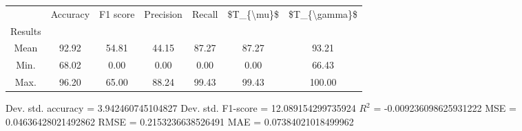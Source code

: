 \begin{tabular}{|c|c|c|c|c|c|c|}
\toprule
{} &  Accuracy &  F1 score &  Precision &  Recall &  \$T\_\{\textbackslash mu\}\$ &  \$T\_\{\textbackslash gamma\}\$ \\
Results &           &           &            &         &            &               \\
\hline
Mean    &     92.92 &     54.81 &      44.15 &   87.27 &      87.27 &         93.21 \\
Min.    &     68.02 &      0.00 &       0.00 &    0.00 &       0.00 &         66.43 \\
Max.    &     96.20 &     65.00 &      88.24 &   99.43 &      99.43 &        100.00 \\
\bottomrule
\end{tabular}

 Dev. std. accuracy = 3.942460745104827
 Dev. std. F1-score = 12.089154299735924
 $R^2$ = -0.009236098625931222
 MSE = 0.04636428021492862
 RMSE = 0.2153236638526491
 MAE = 0.07384021018499962